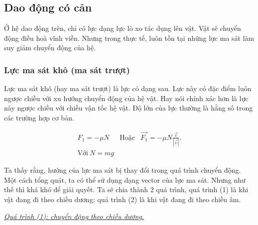 \subsection{Dao động có cản}
Ở hệ dao động trên, chỉ có lực dạng lực lò xo tác dụng lên vật. Vật sẽ chuyển động điều hoà vĩnh viễn. Nhưng trong thực tế, luôn tồn tại những lực ma sát làm suy giảm chuyển động của hệ. 


\subsubsection{Lực ma sát khô (ma sát trượt)}

Lực ma sát khô (hay ma sát trượt) là lực có dạng sau. Lực này có đặc điểm luôn ngược chiều với xu hướng chuyển động của hệ vật. Hay nói chính xác hơn là lực này ngược chiều với chiều vận tốc hệ vật. Độ lớn của lực thường là hằng số trong các trường hợp cơ bản.

\begin{equation}
\begin{array}{ccc}
    F_1 = - \mu N &\text{Hoặc} & \Vec{F_1} = - \mu N {\displaystyle  \frac{\Vec{v}}{|\Vec{v}|}}. \\
    \text{Với} \ N = mg & &
\end{array}
\label{eq:1.3}
\end{equation}

\begin{figure}[!htb]
    \centering
    \scalebox{0.8}{}
    \caption{}
    \label{fig:1.2}
\end{figure}


Ta thấy rằng, hướng của lực ma sát bị thay đổi trong quá trình chuyển động. Một cách tổng quát, ta có thể sử dụng dạng vector của lực ma sát. Nhưng như thế thì khá khó để giải quyết. Ta sẽ chia thành 2 quá trình, quá trình (1) là khi vật đang đi theo chiều dương; quá trình (2) là khi vật đang đi theo chiều âm.



\vspace{2mm}

\underline{\textit{Quá trình (1): chuyển động theo chiều dương.}}
\vspace{2mm}

